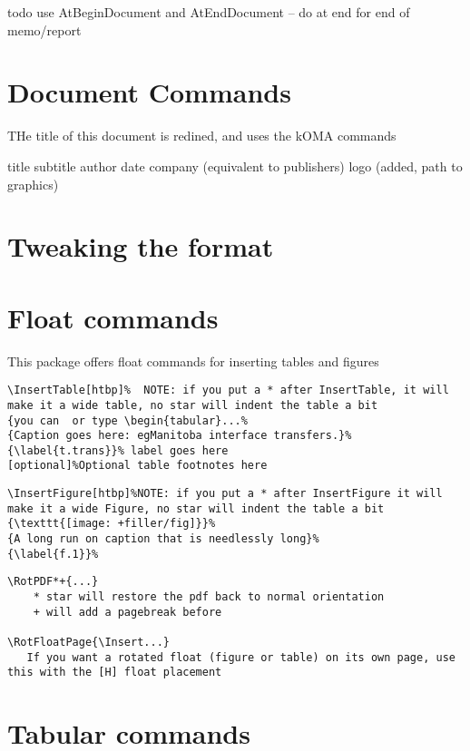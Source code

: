 \documentclass{corpboreport}
\begin{document}
todo use AtBeginDocument and AtEndDocument -- do at end for  end of memo/report

\section{Document Commands}
THe title of this document is redined, and uses the kOMA commands

title
subtitle
author
date
company (equivalent to publishers)
logo (added, path to graphics)

\section{Tweaking the format}

\section{Float commands}

This package offers float commands for inserting tables and figures

\lstset{language=tex}
\begin{lstlisting}
\InsertTable[htbp]%  NOTE: if you put a * after InsertTable, it will make it a wide table, no star will indent the table a bit
{you can  or type \begin{tabular}...%
{Caption goes here: egManitoba interface transfers.}%
{\label{t.trans}}% label goes here
[optional]%Optional table footnotes here
\end{lstlisting}


\lstset{language=tex}
\begin{lstlisting}
\InsertFigure[htbp]%NOTE: if you put a * after InsertFigure it will make it a wide Figure, no star will indent the table a bit
{\texttt{[image: +filler/fig]}}%
{A long run on caption that is needlessly long}%
{\label{f.1}}%
\end{lstlisting}



\lstset{language=tex}
\begin{lstlisting}
\RotPDF*+{...}
	* star will restore the pdf back to normal orientation
	+ will add a pagebreak before

\RotFloatPage{\Insert...}
   If you want a rotated float (figure or table) on its own page, use this with the [H] float placement
\end{lstlisting}



\section{Tabular commands}
\end{document}
